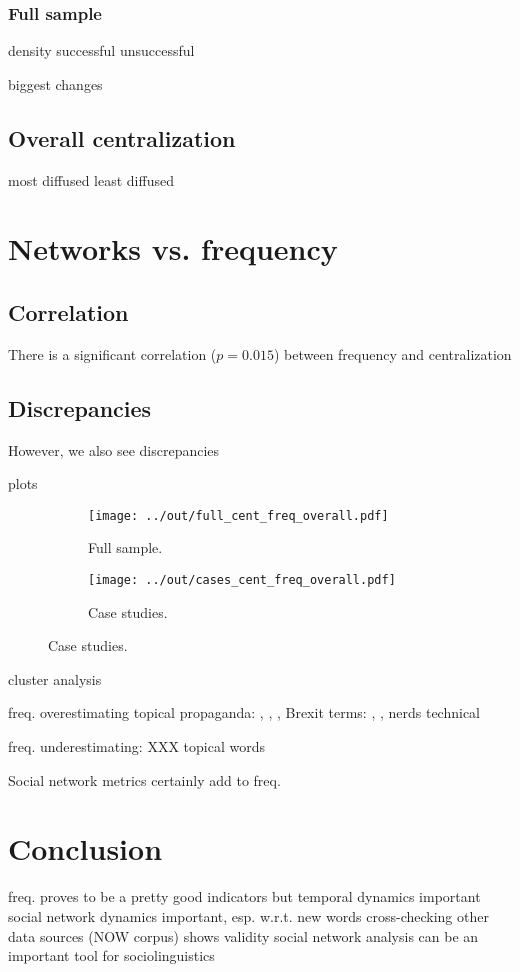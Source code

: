 \documentclass[draft, a4paper, abstract=on]{scrartcl}
\begin{document}
    \subsubsection{Full sample}

density
successful
unsuccessful

biggest changes

  \subsection{Overall centralization}

most diffused
least diffused

\section{Networks vs. frequency}

  \subsection{Correlation}

There is a significant correlation ($p = 0.015$) between frequency and centralization

  \subsection{Discrepancies}

However, we also see discrepancies

plots

\begin{figure}[H]
\centering
\begin{subfigure}{.45\linewidth}
\caption{Full sample.}
\centering
\texttt{[image: ../out/full\_cent\_freq\_overall.pdf]}
\end{subfigure}
\begin{subfigure}{.45\linewidth}
\caption{Case studies.}
\centering
\texttt{[image: ../out/cases\_cent\_freq\_overall.pdf]}
\end{subfigure}
\end{figure}

cluster analysis

freq. overestimating
topical
propaganda: , , , 
Brexit terms: , , 
nerds
technical

freq. underestimating: XXX
topical words

Social network metrics certainly add to freq.

\section{Conclusion}

  freq. proves to be a pretty good indicators
  but
  temporal dynamics important
  social network dynamics important, esp. w.r.t. new words
  cross-checking other data sources (NOW corpus) shows validity
  social network analysis can be an important tool for sociolinguistics


 \printbibliography
\end{document}
